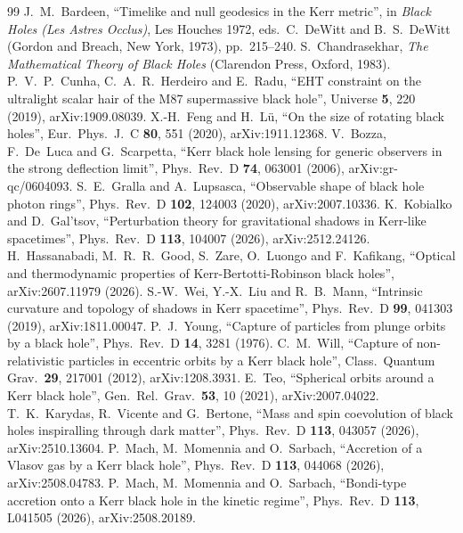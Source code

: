 \documentclass[11pt,a4paper]{article}
\theoremstyle{remark}
\numberwithin{equation}{section}
\begin{document}
\begin{thebibliography}{99}
 J.~M.~Bardeen, ``Timelike and null geodesics in the Kerr metric'', in \emph{Black Holes (Les Astres Occlus)}, Les Houches 1972, eds.\ C.~DeWitt and B.~S.~DeWitt (Gordon and Breach, New York, 1973), pp.\ 215--240.
 S.~Chandrasekhar, \emph{The Mathematical Theory of Black Holes} (Clarendon Press, Oxford, 1983).
 P.~V.~P.~Cunha, C.~A.~R.~Herdeiro and E.~Radu, ``EHT constraint on the ultralight scalar hair of the M87 supermassive black hole'', Universe \textbf{5}, 220 (2019), arXiv:1909.08039.
 X.-H.~Feng and H.~L\"u, ``On the size of rotating black holes'', Eur.\ Phys.\ J.\ C \textbf{80}, 551 (2020), arXiv:1911.12368.
 V.~Bozza, F.~De~Luca and G.~Scarpetta, ``Kerr black hole lensing for generic observers in the strong deflection limit'', Phys.\ Rev.\ D \textbf{74}, 063001 (2006), arXiv:gr-qc/0604093.
 S.~E.~Gralla and A.~Lupsasca, ``Observable shape of black hole photon rings'', Phys.\ Rev.\ D \textbf{102}, 124003 (2020), arXiv:2007.10336.
 K.~Kobialko and D.~Gal'tsov, ``Perturbation theory for gravitational shadows in Kerr-like spacetimes'', Phys.\ Rev.\ D \textbf{113}, 104007 (2026), arXiv:2512.24126.
 H.~Hassanabadi, M.~R.~R.~Good, S.~Zare, O.~Luongo and F.~Kafikang, ``Optical and thermodynamic properties of Kerr-Bertotti-Robinson black holes'', arXiv:2607.11979 (2026).
 S.-W.~Wei, Y.-X.~Liu and R.~B.~Mann, ``Intrinsic curvature and topology of shadows in Kerr spacetime'', Phys.\ Rev.\ D \textbf{99}, 041303 (2019), arXiv:1811.00047.
 P.~J.~Young, ``Capture of particles from plunge orbits by a black hole'', Phys.\ Rev.\ D \textbf{14}, 3281 (1976).
 C.~M.~Will, ``Capture of non-relativistic particles in eccentric orbits by a Kerr black hole'', Class.\ Quantum Grav.\ \textbf{29}, 217001 (2012), arXiv:1208.3931.
 E.~Teo, ``Spherical orbits around a Kerr black hole'', Gen.\ Rel.\ Grav.\ \textbf{53}, 10 (2021), arXiv:2007.04022.
 T.~K.~Karydas, R.~Vicente and G.~Bertone, ``Mass and spin coevolution of black holes inspiralling through dark matter'', Phys.\ Rev.\ D \textbf{113}, 043057 (2026), arXiv:2510.13604.
 P.~Mach, M.~Momennia and O.~Sarbach, ``Accretion of a Vlasov gas by a Kerr black hole'', Phys.\ Rev.\ D \textbf{113}, 044068 (2026), arXiv:2508.04783.
 P.~Mach, M.~Momennia and O.~Sarbach, ``Bondi-type accretion onto a Kerr black hole in the kinetic regime'', Phys.\ Rev.\ D \textbf{113}, L041505 (2026), arXiv:2508.20189.

\end{thebibliography}
\end{document}
